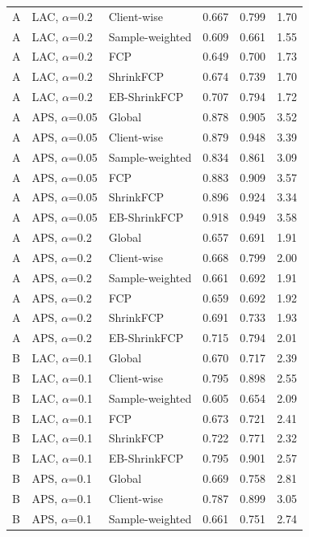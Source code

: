 \documentclass[10pt]{article}
\begin{document}
\begin{table}[!htbp]
\begin{tabular}{@{}lllrrr@{}}
A & LAC, $\alpha$=0.2 & Client-wise & 0.667 & 0.799 & 1.70 \\
A & LAC, $\alpha$=0.2 & Sample-weighted & 0.609 & 0.661 & 1.55 \\
A & LAC, $\alpha$=0.2 & FCP & 0.649 & 0.700 & 1.73 \\
A & LAC, $\alpha$=0.2 & ShrinkFCP & 0.674 & 0.739 & 1.70 \\
A & LAC, $\alpha$=0.2 & EB-ShrinkFCP & 0.707 & 0.794 & 1.72 \\
\midrule
A & APS, $\alpha$=0.05 & Global & 0.878 & 0.905 & 3.52 \\
A & APS, $\alpha$=0.05 & Client-wise & 0.879 & 0.948 & 3.39 \\
A & APS, $\alpha$=0.05 & Sample-weighted & 0.834 & 0.861 & 3.09 \\
A & APS, $\alpha$=0.05 & FCP & 0.883 & 0.909 & 3.57 \\
A & APS, $\alpha$=0.05 & ShrinkFCP & 0.896 & 0.924 & 3.34 \\
A & APS, $\alpha$=0.05 & EB-ShrinkFCP & 0.918 & 0.949 & 3.58 \\
\midrule
A & APS, $\alpha$=0.2 & Global & 0.657 & 0.691 & 1.91 \\
A & APS, $\alpha$=0.2 & Client-wise & 0.668 & 0.799 & 2.00 \\
A & APS, $\alpha$=0.2 & Sample-weighted & 0.661 & 0.692 & 1.91 \\
A & APS, $\alpha$=0.2 & FCP & 0.659 & 0.692 & 1.92 \\
A & APS, $\alpha$=0.2 & ShrinkFCP & 0.691 & 0.733 & 1.93 \\
A & APS, $\alpha$=0.2 & EB-ShrinkFCP & 0.715 & 0.794 & 2.01 \\
\midrule
B & LAC, $\alpha$=0.1 & Global & 0.670 & 0.717 & 2.39 \\
B & LAC, $\alpha$=0.1 & Client-wise & 0.795 & 0.898 & 2.55 \\
B & LAC, $\alpha$=0.1 & Sample-weighted & 0.605 & 0.654 & 2.09 \\
B & LAC, $\alpha$=0.1 & FCP & 0.673 & 0.721 & 2.41 \\
B & LAC, $\alpha$=0.1 & ShrinkFCP & 0.722 & 0.771 & 2.32 \\
B & LAC, $\alpha$=0.1 & EB-ShrinkFCP & 0.795 & 0.901 & 2.57 \\
\midrule
B & APS, $\alpha$=0.1 & Global & 0.669 & 0.758 & 2.81 \\
B & APS, $\alpha$=0.1 & Client-wise & 0.787 & 0.899 & 3.05 \\
B & APS, $\alpha$=0.1 & Sample-weighted & 0.661 & 0.751 & 2.74 \\

\end{tabular}
\end{table}
\end{document}
